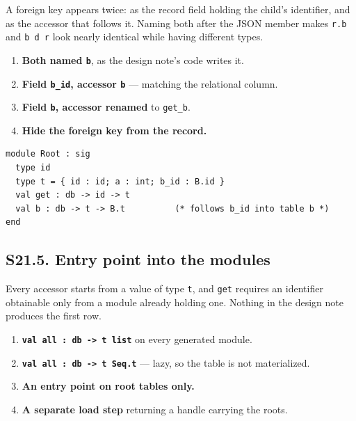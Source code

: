 A foreign key appears twice: as the record field holding the child's
identifier, and as the accessor that follows it. Naming both after the JSON
member makes \texttt{r.b} and \texttt{b d r} look nearly identical while having
different types.

\options
\begin{enumerate}[label=\textbf{(\alph*)}]
  \item \textbf{Both named \texttt{b}}, as the design note's code writes it.
  \item \textbf{Field \texttt{b\_id}, accessor \texttt{b}} --- matching the
        relational column. \selected
  \item \textbf{Field \texttt{b}, accessor renamed} to \texttt{get\_b}.
  \item \textbf{Hide the foreign key from the record.}
\end{enumerate}


\begin{lstlisting}[style=ml]
module Root : sig
  type id
  type t = { id : id; a : int; b_id : B.id }
  val get : db -> id -> t
  val b : db -> t -> B.t          (* follows b_id into table b *)
end
\end{lstlisting}


\subsection*{S21.5. Entry point into the modules}

Every accessor starts from a value of type \texttt{t}, and \texttt{get}
requires an identifier obtainable only from a module already holding one.
Nothing in the design note produces the first row.

\options
\begin{enumerate}[label=\textbf{(\alph*)}]
  \item \textbf{\texttt{val all : db -> t list}} on every generated module.
        \selected
  \item \textbf{\texttt{val all : db -> t Seq.t}} --- lazy, so the table is
        not materialized.
  \item \textbf{An entry point on root tables only.}
  \item \textbf{A separate load step} returning a handle carrying the roots.
\end{enumerate}

